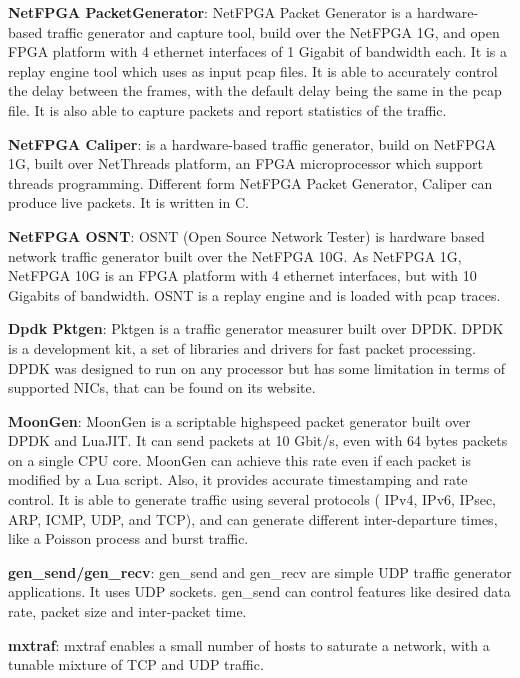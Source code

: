 \textbf{NetFPGA PacketGenerator}\cite{web-netfpgapacketgenerator}: NetFPGA Packet Generator is a hardware-based traffic generator and capture tool, build over the NetFPGA 1G, and open \acrshort{FPGA} platform with 4 ethernet interfaces of 1 Gigabit of bandwidth each. It is a replay engine tool which uses as input pcap files. It is able to accurately control the delay between the frames, with the default delay being the same in the pcap file. It is also able to capture packets and report statistics of the traffic. 


\textbf{NetFPGA Caliper}\cite{web-caliper}: is a hardware-based traffic generator, build on NetFPGA 1G, built over NetThreads platform, an FPGA microprocessor which support threads programming. Different form NetFPGA Packet Generator, Caliper can produce live packets. It is written in C. 

\textbf{NetFPGA OSNT}\cite{web-osnt}:  OSNT (Open Source Network Tester) is hardware based network traffic generator built over the NetFPGA 10G. As NetFPGA 1G, NetFPGA 10G is an FPGA platform with 4 ethernet interfaces, but with 10 Gigabits of bandwidth. OSNT is a replay engine and is loaded with pcap traces. 


\textbf{Dpdk Pktgen}\cite{web-dpdk-pktgen}: Pktgen is a traffic generator measurer built over DPDK. DPDK is a development kit, a set of libraries and drivers for fast packet processing. DPDK was designed to run on any processor but has some limitation in terms of supported NICs, that can be found on its website.

\textbf{MoonGen}\cite{moongen-paper}\cite{web-moongen}: MoonGen is a scriptable highspeed packet generator built over DPDK and LuaJIT. It can send packets at 10 Gbit/s, even with 64 bytes packets on a single CPU core. MoonGen can achieve this rate even if each packet is modified by a Lua script. Also, it provides accurate timestamping and rate control. It is able to generate traffic using several protocols ( IPv4, IPv6, IPsec, ARP, ICMP, UDP, and TCP), and can generate different inter-departure times, like a Poisson process and burst traffic. 

\textbf{gen\_send/gen\_recv}\cite{web-gensend-genrecv}:  gen\_send and gen\_recv are simple UDP traffic generator applications. It uses UDP sockets. gen\_send can control features like desired data rate, packet size and inter-packet time. 

\textbf{mxtraf}\cite{web-mxtraf}:  mxtraf enables a small number of hosts to saturate a network, with a tunable mixture of TCP and UDP traffic.

